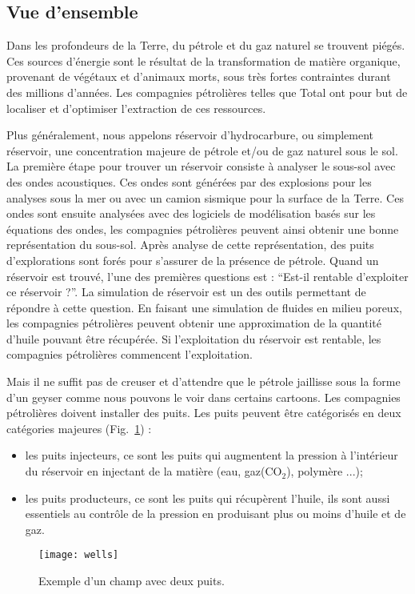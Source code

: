 \subsection{Vue d'ensemble}
Dans les profondeurs de la Terre, du pétrole et du gaz naturel se trouvent piégés.
%
Ces sources d'énergie sont le résultat de la transformation de matière organique, provenant de végétaux et d'animaux morts, sous très fortes contraintes durant des millions d'années.
%
Les compagnies pétrolières telles que Total ont pour but de localiser et d'optimiser l'extraction de ces ressources.

Plus généralement, nous appelons réservoir d'hydrocarbure, ou simplement réservoir, une concentration majeure de pétrole et/ou de gaz naturel sous le sol.
%
La première étape pour trouver un réservoir consiste à analyser le sous-sol avec des ondes acoustiques.
%
Ces ondes sont générées par des explosions pour les analyses sous la mer ou avec un camion sismique pour la surface de la Terre.
%
Ces ondes sont ensuite analysées avec des logiciels de modélisation basés sur les équations des ondes, les compagnies pétrolières peuvent ainsi obtenir une bonne représentation du sous-sol.
%
Après analyse de cette représentation, des puits d'explorations sont forés pour s'assurer de la présence de pétrole.
%
Quand un réservoir est trouvé, l'une des premières questions est : ``Est-il rentable d'exploiter ce réservoir ?''.
%
La simulation de réservoir est un des outils permettant de répondre à cette question.
%
En faisant une simulation de fluides en milieu poreux, les compagnies pétrolières peuvent obtenir une approximation de la quantité d'huile pouvant être récupérée.
%
Si l'exploitation du réservoir est rentable, les compagnies pétrolières commencent l'exploitation.

Mais il ne suffit pas de creuser et d'attendre que le pétrole jaillisse sous la forme d'un geyser comme nous pouvons le voir dans certains cartoons.
%
Les compagnies pétrolières doivent installer des puits.
%
Les puits peuvent être catégorisés en deux catégories majeures (Fig.~\ref{fig:wells}) :
%
\begin{itemize}
  \item les puits injecteurs, ce sont les puits qui augmentent la pression à l'intérieur du réservoir en injectant de la matière (eau, gaz(CO$_2$), polymère ...);
  \item les puits producteurs, ce sont les puits qui récupèrent l'huile, ils sont aussi essentiels au contrôle de la pression en produisant plus ou moins d'huile et de gaz.
\end{itemize}
\begin{figure}[!h]
  \centering
  \texttt{[image: wells]}
  \caption{Exemple d'un champ avec deux puits.}
\label{fig:wells}
\end{figure}

